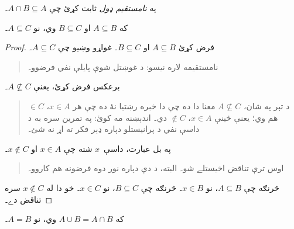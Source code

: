 \documentclass[../../../include/open-logic-section]{subfiles}
\begin{document}
\begin{prob}
په \emph{نامستقيم ډول} ثابت کړئ چې $A \cap B \subseteq A$۔
\end{prob}

\begin{prop}
که $A \subseteq B$ او $B \subseteq C$ وي، نو $A \subseteq C$۔
\end{prop}

\begin{proof}
  فرض کړئ $A \subseteq B$ او $B \subseteq C$۔ غواړو وښيو چې
  $A
  \subseteq C$۔
  \begin{quote}
    نامستقيمه لاره نيسو: د غوښتل شوې پايلې نفي فرضوو۔
  \end{quote}
  برعکس فرض کړئ، يعنې $A \nsubseteq C$۔
  \begin{quote}
    د تېر په شان، $A \nsubseteq C$ معنا دا ده چې دا خبره
    رښتيا نۀ ده چې هر $x \in A$، $\in C$ هم وي؛
    يعنې ځينې $x \in A$، $\notin C$ دي۔ اندېښنه مه کوئ:
    په تمرين سره به د داسې نفي د پرانيستلو دپاره
    ډېر فکر ته اړ نه شئ۔
  \end{quote}
  په بل عبارت، داسې~$x$ شته چې $x \in A$ او
  $x \notin C$۔
  \begin{quote}
    اوس ترې تناقض اخيستلے شو۔ البته، د دې دپاره
    نور دوه فرضونه هم کاروو۔
  \end{quote}
  څرنګه چې $A \subseteq B$، نو $x \in B$۔ څرنګه چې
  $B \subseteq C$، نو $x \in
  C$۔ خو دا له $x \notin C$ سره تناقض دے۔
\end{proof}

\begin{prop}
که $A \cup B = A \cap B$ وي، نو $A = B$۔
\end{prop}
\end{document}
